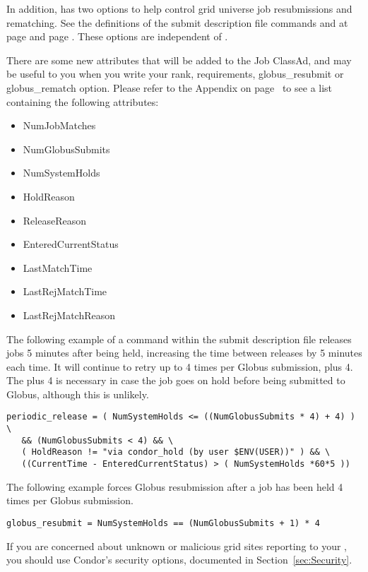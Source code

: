 In addition,  has two options to help control
grid universe job resubmissions and rematching.  
See the definitions of the submit description file commands
 and  at 
page \pageref{condor-submit-globus-rematch} and
page \pageref{condor-submit-globus-resubmit}.
These options are independent of .

There are some new attributes that will be added to the Job ClassAd,
and may be useful to you when you write your rank, requirements,
globus\_resubmit or globus\_rematch option. Please refer to
the Appendix on page~\pageref{sec:Job-ClassAd-Attributes} 
to see a list containing the following attributes:

\begin{itemize}
\item NumJobMatches
\item NumGlobusSubmits
\item NumSystemHolds
\item HoldReason
\item ReleaseReason
\item EnteredCurrentStatus
\item LastMatchTime
\item LastRejMatchTime
\item LastRejMatchReason
\end{itemize}

The following example of a command within the submit description file
releases jobs 5 minutes after being held,
increasing the time between releases by 5 minutes each time.
It will continue to retry up to 4 times per Globus
submission, plus 4.
The plus 4 is necessary in case
the job goes on hold before being submitted to Globus, although
this is unlikely.

\footnotesize
\begin{verbatim}
periodic_release = ( NumSystemHolds <= ((NumGlobusSubmits * 4) + 4) ) \
   && (NumGlobusSubmits < 4) && \
   ( HoldReason != "via condor_hold (by user $ENV(USER))" ) && \
   ((CurrentTime - EnteredCurrentStatus) > ( NumSystemHolds *60*5 ))
\end{verbatim}
\normalsize

The following example forces Globus resubmission after a job has
been held 4 times per Globus submission.

\footnotesize
\begin{verbatim}
globus_resubmit = NumSystemHolds == (NumGlobusSubmits + 1) * 4
\end{verbatim}
\normalsize

If you are concerned about unknown or malicious grid sites reporting
to your , you should use Condor's security options,
documented in Section~\ref{sec:Security}.
